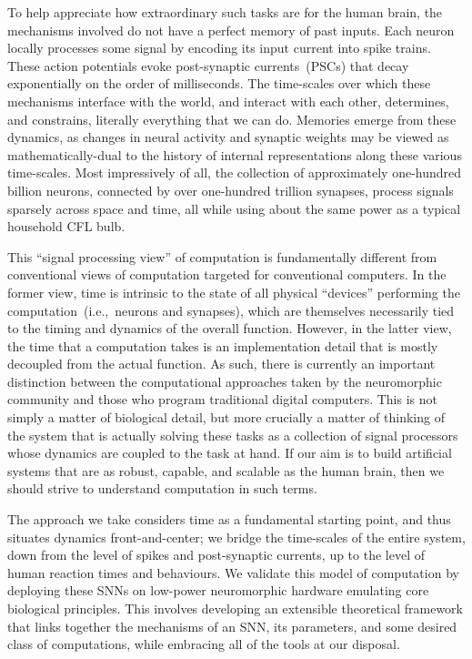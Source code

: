 To help appreciate how extraordinary such tasks are for the human brain, the mechanisms involved do not have a perfect memory of past inputs.
Each neuron locally processes some signal by encoding its input current into spike trains.
These action potentials evoke post-synaptic currents~(PSCs) that decay exponentially on the order of milliseconds.
The time-scales over which these mechanisms interface with the world, and interact with each other, determines, and constrains, literally everything that we can do.
Memories emerge from these dynamics, as changes in neural activity and synaptic weights may be viewed as mathematically-dual to the history of internal representations along these various time-scales.
Most impressively of all, the collection of approximately one-hundred billion neurons, connected by over one-hundred trillion synapses, process signals sparsely across space and time, all while using about the same power as a typical household CFL bulb.

This ``signal processing view'' of computation is fundamentally different from conventional views of computation targeted for conventional computers.
In the former view, time is intrinsic to the state of all physical ``devices'' performing the computation~(i.e.,~neurons and synapses), which are themselves necessarily tied to the timing and dynamics of the overall function.
However, in the latter view, the time that a computation takes is an implementation detail that is mostly decoupled from the actual function.
As such, there is currently an important distinction between the computational approaches taken by the neuromorphic community and those who program traditional digital computers.
This is not simply a matter of biological detail, but more crucially a matter of thinking of the system that is actually solving these tasks as a collection of signal processors whose dynamics are coupled to the task at hand.
If our aim is to build artificial systems that are as robust, capable, and scalable as the human brain, then we should strive to understand computation in such terms.

The approach we take considers time as a fundamental starting point, and thus situates dynamics front-and-center; we bridge the time-scales of the entire system, down from the level of spikes and post-synaptic currents, up to the level of human reaction times and behaviours. 
We validate this model of computation by deploying these SNNs on low-power neuromorphic hardware emulating core biological principles.
This involves developing an extensible theoretical framework that links together the mechanisms of an SNN, its parameters, and some desired class of computations, while embracing all of the tools at our disposal.

